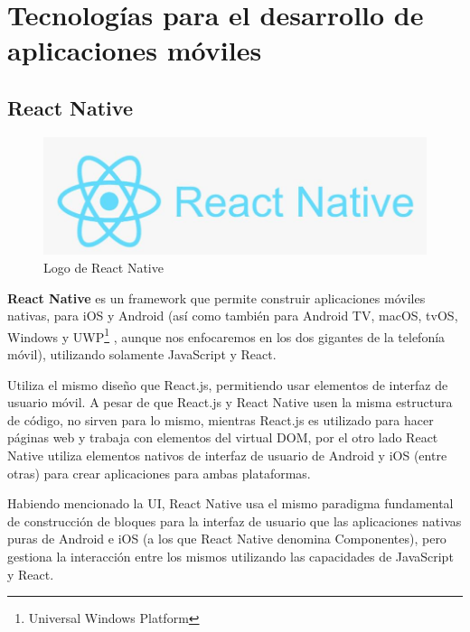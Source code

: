 \section{Tecnologías para el desarrollo de aplicaciones móviles}\label{chapter:introduction}

\subsection{React Native}\label{chapter:introduction}



\begin{figure}[h!]
\begin{center}
\includegraphics[scale=0.5]{Graphics/images/LogodeReactNative.jpg}
\caption{Logo de React Native}
\label{fig:dh}

\end{center}
\end{figure}


\textbf{React Native} es un framework que permite construir aplicaciones móviles nativas, para iOS y Android (así como también para Android TV, macOS, tvOS, Windows y UWP\footnote{Universal Windows Platform}  , aunque nos enfocaremos en los dos gigantes de la telefonía móvil), utilizando solamente JavaScript y React.

Utiliza el mismo diseño que React.js, permitiendo usar elementos de interfaz de usuario móvil. A pesar de que React.js y React Native usen la misma estructura de código, no sirven para lo mismo, mientras React.js es utilizado para hacer páginas web y trabaja con elementos del virtual DOM, por el otro lado React Native utiliza elementos nativos de interfaz de usuario de Android y iOS (entre otras) para crear aplicaciones para ambas plataformas.

Habiendo mencionado la UI, React Native usa el mismo paradigma fundamental de construcción de bloques para la interfaz de usuario que las aplicaciones nativas puras de Android e iOS (a los que React Native denomina Componentes), pero gestiona la interacción entre los mismos utilizando las capacidades de JavaScript y React.

